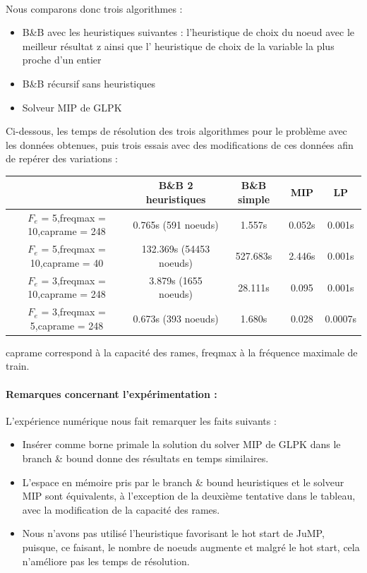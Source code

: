\documentclass[a4paper,10pt]{article}
\begin{document}
\paragraph{}
Nous comparons donc trois algorithmes :
\begin{itemize}
\item B\&B avec les heuristiques suivantes : l'heuristique de choix du noeud avec le meilleur résultat z ainsi que l' heuristique de choix de la variable la plus proche d'un entier
\item B\&B récursif sans heuristiques
\item Solveur MIP de GLPK
\end{itemize}
Ci-dessous, les temps de résolution des trois algorithmes pour le problème avec les données obtenues, puis trois essais avec des modifications de ces données afin de repérer des variations :
\begin{center}
  \begin{tabular}{|c|c|c|c|c|}
    \hline
    & B\&B 2 heuristiques & B\&B simple & MIP & LP\\
    \hline
    $F_e$ = 5,freqmax = 10,caprame = 248 & 0.765s (591 noeuds) & 1.557s & 0.052s & 0.001s\\
    \hline
    $F_e$ = 5,freqmax = 10,caprame = 40 & 132.369s (54453 noeuds) & 527.683s & 2.446s & 0.001s\\
    \hline
    $F_e$ = 3,freqmax = 10,caprame = 248 & 3.879s (1655 noeuds) & 28.111s & 0.095 & 0.001s\\
    \hline
    $F_e$ = 3,freqmax = 5,caprame = 248 & 0.673s (393 noeuds) & 1.680s & 0.028 & 0.0007s\\
    \hline
  \end{tabular}
\end{center}
caprame correspond à la capacité des rames, freqmax à la fréquence maximale de train.

\paragraph{Remarques concernant l'expérimentation : }
L'expérience numérique nous fait remarquer les faits suivants :
\begin{itemize}
\item Insérer comme borne primale la solution du solver MIP de GLPK dans le branch \& bound donne des résultats en temps similaires.  
\item L'espace en mémoire pris par le branch \& bound heuristiques et le solveur MIP sont équivalents, à l'exception de la deuxième tentative dans le tableau, avec la modification de la capacité des rames. 
\item Nous n'avons pas utilisé l'heuristique favorisant le hot start de JuMP, puisque, ce faisant, le nombre de noeuds augmente et malgré le hot start, cela n'améliore pas les temps de résolution. 
\end{itemize}
\end{document}
